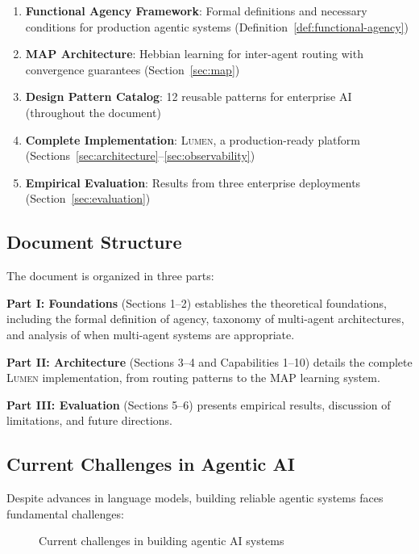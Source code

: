 \documentclass[11pt,a4paper]{article}
\theoremstyle{definition}
\theoremstyle{remark}
\newcommand{\lumen}{\textsc{Lumen}\xspace}
\newcommand{\map}{\textsc{MAP}\xspace}
\begin{document}
\begin{enumerate}
    \item \textbf{Functional Agency Framework}: Formal definitions and necessary conditions for production agentic systems (Definition~\ref{def:functional-agency})

    \item \textbf{\map Architecture}: Hebbian learning for inter-agent routing with convergence guarantees (Section~\ref{sec:map})

    \item \textbf{Design Pattern Catalog}: 12 reusable patterns for enterprise AI (throughout the document)

    \item \textbf{Complete Implementation}: \lumen, a production-ready platform (Sections~\ref{sec:architecture}--\ref{sec:observability})

    \item \textbf{Empirical Evaluation}: Results from three enterprise deployments (Section~\ref{sec:evaluation})
\end{enumerate}

\subsection{Document Structure}

The document is organized in three parts:

\textbf{Part I: Foundations} (Sections 1--2) establishes the theoretical foundations, including the formal definition of agency, taxonomy of multi-agent architectures, and analysis of when multi-agent systems are appropriate.

\textbf{Part II: Architecture} (Sections 3--4 and Capabilities 1--10) details the complete \lumen implementation, from routing patterns to the \map learning system.

\textbf{Part III: Evaluation} (Sections 5--6) presents empirical results, discussion of limitations, and future directions.

\subsection{Current Challenges in Agentic AI}

Despite advances in language models, building reliable agentic systems faces fundamental challenges:

\begin{figure}[H]
    \centering
    \vspace{0.5em}
    
    \vspace{0.5em}
    \caption{Current challenges in building agentic AI systems}
    \label{fig:current-challenges}
\end{figure}
\end{document}
